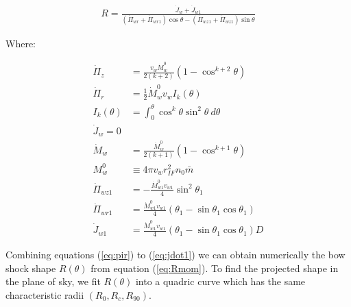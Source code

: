 \begin{align}
  R = \frac{\dot{J}_w + \dot{J}_{w1}}{\left(\dot{\Pi}_{wr}+\dot{\Pi}_{wr1}\right)\cos\theta-\left(\dot{\Pi}_{wz1}+\dot{\Pi}_{wz1}\right)\sin\theta}
  \label{eq:Rmom}
\end{align}

Where:

\begin{align}
\dot{\Pi}_z &= \frac{v_w\dot{M}_w^0}{2(k+2)}\left(1-\cos^{k+2}\theta\right)  \label{eq:pir}\\
\dot{\Pi}_r &= \frac{1}{2}\dot{M}^0_w v_w I_k (\theta) \label{eq:piz}\\
I_k(\theta) & = \int^\theta_0 \cos^k \theta \sin^2\theta~d\theta \\
\dot{J}_w = 0 \label{eq:jdot} \\
\dot{M}_w &= \frac{\dot{M}_w^0}{2(k+1)}\left(1-\cos^{k+1}\theta\right) \label{eq:dotprop} \\
M^0_w &\equiv 4\pi v_w r^2_{IF} n_0 \bar{m}\\
\dot{\Pi}_{wz1} & = -\frac{\dot{M}^0_{w1}v_{w1}}{4}\sin^2\theta_1\\
\dot{\Pi}_{wr1} & = \frac{\dot{M}^0_{w1}v_{w1}}{4}\left(\theta_1-\sin\theta_1\cos\theta_1\right)\\
\dot{J}_{w1} & = \frac{\dot{M}^0_{w1}v_{w1}}{4}\left(\theta_1-\sin\theta_1\cos\theta_1\right)D \label{eq:jdot1}
\end{align}

Combining equations  (\ref{eq:pir}) to (\ref{eq:jdot1}) we can obtain numerically the bow shock shape $R(\theta)$ from equation (\ref{eq:Rmom}).
To find the projected shape in the plane of sky, we fit $R(\theta)$ into a quadric curve which has the same characteristic radii $(R_0,R_c,R_{90})$. 

